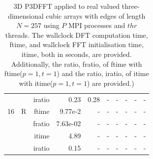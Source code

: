 \documentclass[a4paper]{article}
\begin{document}
\begin{table}[htbp]
\begin{center}
\begin{small}
\begin{tabular}{|r|r|r|r|r|r|r|r|r|r|}
             &             &  iratio &    0.23 &    0.28 &      - &      - &      - &      - &      - \\
   16 &  R &   ftime &   9.77e-2 &      - &      - &      - &      - &      - &      - \\\hline
             &             &  fratio &    7.63e-02 &     - &      - &      - &      - &      - &      - \\
             &             &  itime &    4.89  &      - &      - &      - &      - &      - &      - \\
             &             &  iratio &    0.15 &      - &      - &      - &      - &      - &      - \\\hline

\end{tabular}
\caption{3D P3DFFT applied to real valued three-dimensional cubic arrays with edges of length $N=257$ using $P$ MPI processes and $thr$ threads. The wallclock DFT computation time, ftime, and wallclock FFT initialisation time, itime, both in seconds, are provided. Additionally, the ratio, fratio, of ftime  with ftime($p=1,t=1$) and the ratio, iratio, of itime  with itime($p=1,t=1$) are provided.) }\label{Tbl:P3DFFT3d257}
\end{small}
\end{center}
\end{table}
\end{document}
